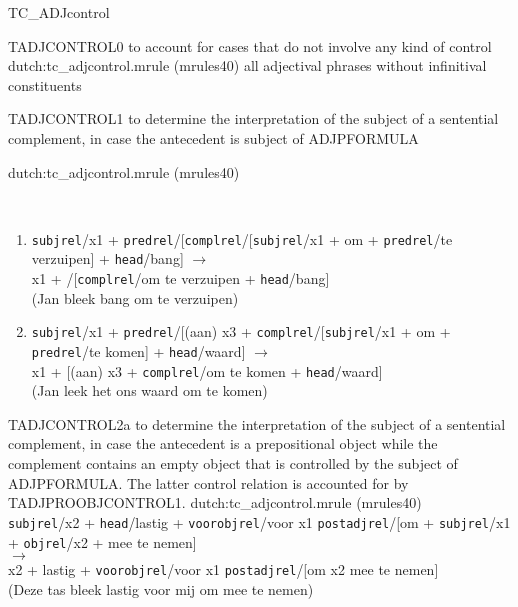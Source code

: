 \begin{mruleclass}{TC\_ADJcontrol}
\begin{classdescr}
\end{classdescr}

\begin{members}
\begin{member}
 TADJCONTROL0
 to account for cases that do not involve any kind of control
\file dutch:tc\_adjcontrol.mrule (mrules40)
\semantics \nosemantics
\example all adjectival phrases without infinitival constituents
\remarks\mbox{}

\end{member}

\begin{member}
 TADJCONTROL1
 to determine the interpretation of the subject of
a sentential complement, in case the antecedent is  subject of ADJPFORMULA

\file dutch:tc\_adjcontrol.mrule (mrules40)

\semantics \nosemantics

\example \mbox{}\\
\begin{enumerate}
  \item 


{\tt subjrel}/x1 + {\tt predrel}/[{\tt complrel}/[{\tt subjrel}/x1 +
om + {\tt predrel}/te verzuipen] + {\tt head}/bang]
$\rightarrow$\\ 
x1 + /[{\tt complrel}/om te verzuipen + {\tt head}/bang] 
\\
(Jan bleek bang om te verzuipen)\\

  \item

{\tt subjrel}/x1 + {\tt predrel}/[(aan) x3 + {\tt complrel}/[{\tt subjrel}/x1 +
om + {\tt predrel}/te komen] + {\tt head}/waard]
$\rightarrow$\\ 
x1 + [(aan) x3 + {\tt complrel}/om te komen + 
{\tt head}/waard] 
\\
(Jan leek het ons waard om te komen)
\end{enumerate}

\remarks\mbox{}


\end{member}
\begin{member}
 TADJCONTROL2a
 to determine the interpretation of the subject of
a sentential complement, in case the antecedent is a prepositional object 
while the complement contains an empty object that is 
controlled by the subject of ADJPFORMULA. The latter control relation is 
accounted for by TADJPROOBJCONTROL1.
\file dutch:tc\_adjcontrol.mrule (mrules40)
\semantics \nosemantics
\example \mbox{}\\
{\tt subjrel}/x2 + {\tt head}/lastig + {\tt voorobjrel}/voor x1
{\tt postadjrel}/[om + {\tt subjrel}/x1 + {\tt objrel}/x2  + mee te nemen]\\
$\rightarrow$ \\
x2 + lastig + {\tt voorobjrel}/voor x1
{\tt postadjrel}/[om x2 mee te nemen]\\
(Deze tas bleek  lastig voor mij om mee te nemen)


\end{member}
\end{members}
\end{mruleclass}
